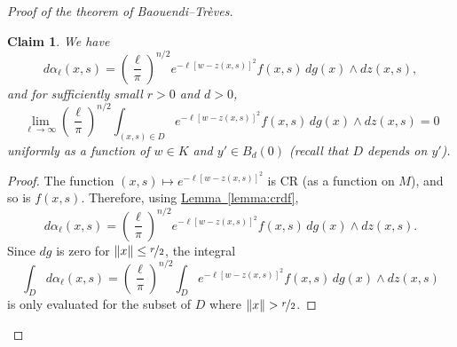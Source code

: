 \documentclass[12pt,openany]{book}
\newcommand{\snorm}[1]{\lVert {#1} \rVert}
\theoremstyle{plain}
\newtheorem{claim}[thm]{Claim}
\theoremstyle{remark}
\theoremstyle{definition}
\theoremstyle{exercise}
\theoremstyle{example}
\newcommand{\lemmaref}[1]{\hyperref[#1]{Lemma~\ref*{#1}}}
\begin{document}
\begin{proof}[Proof of the theorem of Baouendi--Tr{\`e}ves]
\begin{claim}
\pagebreak[2]
We have
\begin{equation*}
d \alpha_\ell(x,s)
=
{\left(\frac{\ell}{\pi}\right)}^{n/2}
e^{-\ell [w - z(x,s)]^2} f(x,s)
\,
dg(x) 
\wedge
dz(x,s) ,
\end{equation*}
and for sufficiently small $r>0$ and $d>0$,
\begin{equation*}
\lim_{\ell\to\infty}
{\left(\frac{\ell}{\pi}\right)}^{n/2}
\int_{(x,s)\in D}
e^{-\ell [w - z(x,s)]^2} f(x,s)
\,
dg(x) 
\wedge
dz(x,s)
= 0
\end{equation*}
uniformly as a function of $w \in K$ and $y' \in B_d(0)$ (recall that $D$ depends on
$y'$).
\end{claim}

\begin{proof}
The function
$(x,s) \mapsto e^{-\ell [w - z(x,s)]^2}$ is CR (as a function on $M$), and so
is $f(x,s)$.  Therefore, using \lemmaref{lemma:crdf},
\begin{equation*}
d \alpha_{\ell}(x,s)
=
{\left(\frac{\ell}{\pi}\right)}^{n/2}
e^{-\ell [w - z(x,s)]^2 } f(x,s)
\,
dg(x) 
\wedge
dz(x,s) .
\end{equation*}
Since $dg$ is zero for $\snorm{x} \leq \nicefrac{r}{2}$, the integral
\begin{equation*}
\int_D
d \alpha_\ell(x,s)
=
{\left(\frac{\ell}{\pi}\right)}^{n/2}
\int_D
e^{ -\ell [w - z(x,s)]^2} f(x,s)
\,
dg(x) 
\wedge
dz(x,s)
\end{equation*}
is only evaluated for the subset of $D$ where $\snorm{x} > \nicefrac{r}{2}$.


\end{proof}
\end{proof}
\end{document}
